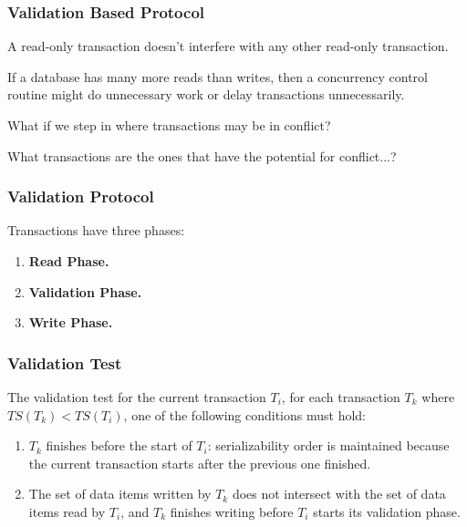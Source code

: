 \begin{frame}
\frametitle{Validation Based Protocol}

A read-only transaction doesn't interfere with any other read-only transaction. 

If a database has many more reads than writes, then a concurrency control routine might do unnecessary work or delay transactions unnecessarily.

What if we step in where transactions may be in conflict?

What transactions are the ones that have the potential for conflict...?


\end{frame}

\begin{frame}
\frametitle{Validation Protocol}

Transactions have three phases:

\begin{enumerate}
	\item \textbf{Read Phase.} 
	\item \textbf{Validation Phase.} 
	\item \textbf{Write Phase.} 
\end{enumerate}

\end{frame}

\begin{frame}
\frametitle{Validation Test}

The validation test for the current transaction $T_{i}$, for each transaction $T_{k}$ where $T\!S(T_{k}) < T\!S(T_{i})$, one of the following conditions must hold:

\begin{enumerate}
	\item $T_{k}$ finishes before the start of $T_{i}$: serializability order is maintained because the current transaction starts after the previous one finished.\\[5em]
	\item The set of data items written by $T_{k}$ does not intersect with the set of data items read by $T_{i}$, and $T_{k}$ finishes writing before $T_{i}$ starts its validation phase. 
\end{enumerate} 

\end{frame}

